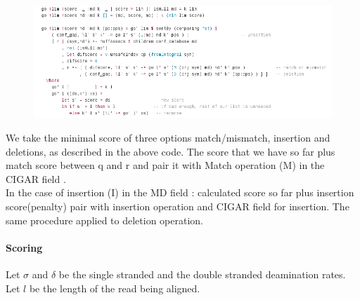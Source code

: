 \documentclass[11pt,a4paper]{report}
\begin{document}
\begin{figure}[H]
\centering
\includegraphics[width=15cm]{pictures/A_HS.png}
\label{formula}
\end{figure}


We take the minimal score of three options match/mismatch, insertion and 
deletions, as described in the above code.
The score that we have so far plus match score between q and r and pair it 
with Match operation (M) in the CIGAR field \cite{samtools}.\\
In the case of insertion (I) in the MD field \cite{samtools}: 
calculated score so far plus insertion score(penalty) pair with insertion
operation and CIGAR field for insertion.
The same procedure applied to deletion operation.




\paragraph{Scoring} \label{Scoring}

Let $\sigma$ and $\delta$ be the single stranded and the double stranded
deamination rates.  Let $l$ be the length of the read being aligned.  
\end{document}
